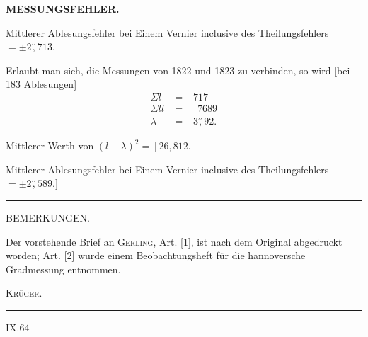 \par\clearpage
\noindent\null\hfill{\small\textbf{MESSUNGSFEHLER.}}\hfill{}\par\medskip
\par\noindent\hspace*{\parindent}Mittlerer Ablesungsfehler bei Einem Vernier inclusive des Theilungsfehlers $=\pm2\overset{\prime\prime}{,}713$.
\par\noindent\hspace*{\parindent}Erlaubt man sich, die Messungen von 1822 und 1823 zu verbinden, so wird [bei 183 Ablesungen]
\[
\begin{aligned}
\Sigma l&=-717\\
\Sigma ll&=\phantom{-}7689\\
\lambda&=-3\overset{\prime\prime}{,}92.
\end{aligned}
\]
\par\noindent\hspace*{\parindent}Mittlerer Werth von $(l-\lambda)^2=\left[26{,}812.\right.$
\par\noindent\hspace*{\parindent}Mittlerer Ablesungsfehler bei Einem Vernier inclusive des Theilungsfehlers $=\pm2\overset{\prime\prime}{,}589.]$
\par\bigskip\bigskip
\begin{center}\rule{2.6cm}{.4pt}\end{center}
\vspace{1.5cm}
{\small
\begin{center}BEMERKUNGEN.\end{center}
\par\noindent\hspace*{\parindent}Der vorstehende Brief an \textsc{Gerling}, Art. [1], ist nach dem Original abgedruckt worden; Art. [2] wurde einem Beobachtungsheft für die hannoversche Gradmessung entnommen.
\par\noindent\hfill\textsc{Krüger.}\hspace*{1em}\par}
\vspace{2cm}
\begin{center}\rule{3.5cm}{.4pt}\end{center}

\vfill
\noindent IX.\hfill 64\hspace*{1cm}\par

\par\clearpage
\null


